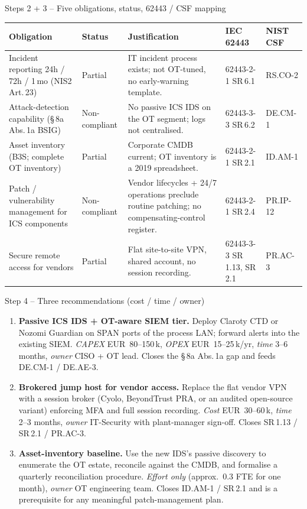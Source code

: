 \documentclass[11pt,a4paper]{article}
\begin{document}
\begin{solutionbox}{Steps 2 + 3 -- Five obligations, status, 62443 / CSF mapping}
\renewcommand{\arraystretch}{1.15}
\noindent\small\begin{tabular}{@{}p{} p{} p{} p{} p{}@{}}
\toprule
\textbf{Obligation} & \textbf{Status} & \textbf{Justification} & \textbf{IEC 62443} & \textbf{NIST CSF} \\
\midrule
Incident reporting 24h / 72h / 1\,mo (NIS2 Art.\,23) & Partial & IT incident process exists; not OT-tuned, no early-warning template. & 62443-2-1 SR\,6.1 & RS.CO-2 \\
Attack-detection capability (\S\,8a Abs.\,1a BSIG) & Non-compliant & No passive ICS IDS on the OT segment; logs not centralised. & 62443-3-3 SR\,6.2 & DE.CM-1 \\
Asset inventory (B3S; complete OT inventory) & Partial & Corporate CMDB current; OT inventory is a 2019 spreadsheet. & 62443-2-1 SR\,2.1 & ID.AM-1 \\
Patch / vulnerability management for ICS components & Non-compliant & Vendor lifecycles + 24/7 operations preclude routine patching; no compensating-control register. & 62443-2-1 SR\,2.4 & PR.IP-12 \\
Secure remote access for vendors & Partial & Flat site-to-site VPN, shared account, no session recording. & 62443-3-3 SR\,1.13, SR\,2.1 & PR.AC-3 \\
\bottomrule
\end{tabular}
\end{solutionbox}

\begin{solutionbox}{Step 4 -- Three recommendations (cost / time / owner)}
\begin{enumerate}\setlength{\itemsep}{2pt}
  \item \textbf{Passive ICS IDS + OT-aware SIEM tier.} Deploy Claroty CTD or Nozomi Guardian on SPAN ports of the process LAN; forward alerts into the existing SIEM. \emph{CAPEX} EUR~80--150\,k, \emph{OPEX} EUR~15--25\,k/yr, \emph{time} 3--6 months, \emph{owner} CISO + OT lead. Closes the \S\,8a Abs.\,1a gap and feeds DE.CM-1 / DE.AE-3.
  \item \textbf{Brokered jump host for vendor access.} Replace the flat vendor VPN with a session broker (Cyolo, BeyondTrust PRA, or an audited open-source variant) enforcing MFA and full session recording. \emph{Cost} EUR~30--60\,k, \emph{time} 2--3 months, \emph{owner} IT-Security with plant-manager sign-off. Closes SR\,1.13 / SR\,2.1 / PR.AC-3.
  \item \textbf{Asset-inventory baseline.} Use the new IDS's passive discovery to enumerate the OT estate, reconcile against the CMDB, and formalise a quarterly reconciliation procedure. \emph{Effort only} (approx.\ 0.3 FTE for one month), \emph{owner} OT engineering team. Closes ID.AM-1 / SR\,2.1 and is a prerequisite for any meaningful patch-management plan.
\end{enumerate}
\end{solutionbox}
\end{document}
